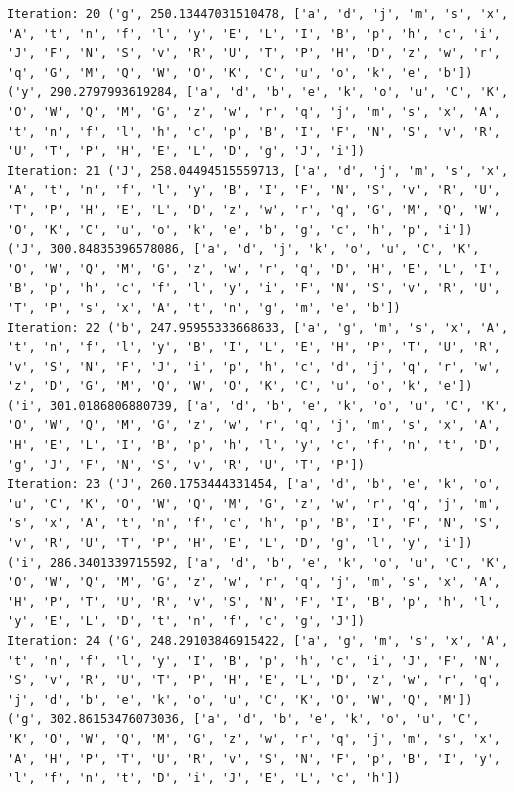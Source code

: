 \documentclass[11pt]{article}
\begin{document}
\begin{lstlisting}
Iteration: 20 ('g', 250.13447031510478, ['a', 'd', 'j', 'm', 's', 'x', 'A', 't', 'n', 'f', 'l', 'y', 'E', 'L', 'I', 'B', 'p', 'h', 'c', 'i', 'J', 'F', 'N', 'S', 'v', 'R', 'U', 'T', 'P', 'H', 'D', 'z', 'w', 'r', 'q', 'G', 'M', 'Q', 'W', 'O', 'K', 'C', 'u', 'o', 'k', 'e', 'b']) ('y', 290.2797993619284, ['a', 'd', 'b', 'e', 'k', 'o', 'u', 'C', 'K', 'O', 'W', 'Q', 'M', 'G', 'z', 'w', 'r', 'q', 'j', 'm', 's', 'x', 'A', 't', 'n', 'f', 'l', 'h', 'c', 'p', 'B', 'I', 'F', 'N', 'S', 'v', 'R', 'U', 'T', 'P', 'H', 'E', 'L', 'D', 'g', 'J', 'i'])
Iteration: 21 ('J', 258.04494515559713, ['a', 'd', 'j', 'm', 's', 'x', 'A', 't', 'n', 'f', 'l', 'y', 'B', 'I', 'F', 'N', 'S', 'v', 'R', 'U', 'T', 'P', 'H', 'E', 'L', 'D', 'z', 'w', 'r', 'q', 'G', 'M', 'Q', 'W', 'O', 'K', 'C', 'u', 'o', 'k', 'e', 'b', 'g', 'c', 'h', 'p', 'i']) ('J', 300.84835396578086, ['a', 'd', 'j', 'k', 'o', 'u', 'C', 'K', 'O', 'W', 'Q', 'M', 'G', 'z', 'w', 'r', 'q', 'D', 'H', 'E', 'L', 'I', 'B', 'p', 'h', 'c', 'f', 'l', 'y', 'i', 'F', 'N', 'S', 'v', 'R', 'U', 'T', 'P', 's', 'x', 'A', 't', 'n', 'g', 'm', 'e', 'b'])
Iteration: 22 ('b', 247.95955333668633, ['a', 'g', 'm', 's', 'x', 'A', 't', 'n', 'f', 'l', 'y', 'B', 'I', 'L', 'E', 'H', 'P', 'T', 'U', 'R', 'v', 'S', 'N', 'F', 'J', 'i', 'p', 'h', 'c', 'd', 'j', 'q', 'r', 'w', 'z', 'D', 'G', 'M', 'Q', 'W', 'O', 'K', 'C', 'u', 'o', 'k', 'e']) ('i', 301.0186806880739, ['a', 'd', 'b', 'e', 'k', 'o', 'u', 'C', 'K', 'O', 'W', 'Q', 'M', 'G', 'z', 'w', 'r', 'q', 'j', 'm', 's', 'x', 'A', 'H', 'E', 'L', 'I', 'B', 'p', 'h', 'l', 'y', 'c', 'f', 'n', 't', 'D', 'g', 'J', 'F', 'N', 'S', 'v', 'R', 'U', 'T', 'P'])
Iteration: 23 ('J', 260.1753444331454, ['a', 'd', 'b', 'e', 'k', 'o', 'u', 'C', 'K', 'O', 'W', 'Q', 'M', 'G', 'z', 'w', 'r', 'q', 'j', 'm', 's', 'x', 'A', 't', 'n', 'f', 'c', 'h', 'p', 'B', 'I', 'F', 'N', 'S', 'v', 'R', 'U', 'T', 'P', 'H', 'E', 'L', 'D', 'g', 'l', 'y', 'i']) ('i', 286.3401339715592, ['a', 'd', 'b', 'e', 'k', 'o', 'u', 'C', 'K', 'O', 'W', 'Q', 'M', 'G', 'z', 'w', 'r', 'q', 'j', 'm', 's', 'x', 'A', 'H', 'P', 'T', 'U', 'R', 'v', 'S', 'N', 'F', 'I', 'B', 'p', 'h', 'l', 'y', 'E', 'L', 'D', 't', 'n', 'f', 'c', 'g', 'J'])
Iteration: 24 ('G', 248.29103846915422, ['a', 'g', 'm', 's', 'x', 'A', 't', 'n', 'f', 'l', 'y', 'I', 'B', 'p', 'h', 'c', 'i', 'J', 'F', 'N', 'S', 'v', 'R', 'U', 'T', 'P', 'H', 'E', 'L', 'D', 'z', 'w', 'r', 'q', 'j', 'd', 'b', 'e', 'k', 'o', 'u', 'C', 'K', 'O', 'W', 'Q', 'M']) ('g', 302.86153476073036, ['a', 'd', 'b', 'e', 'k', 'o', 'u', 'C', 'K', 'O', 'W', 'Q', 'M', 'G', 'z', 'w', 'r', 'q', 'j', 'm', 's', 'x', 'A', 'H', 'P', 'T', 'U', 'R', 'v', 'S', 'N', 'F', 'p', 'B', 'I', 'y', 'l', 'f', 'n', 't', 'D', 'i', 'J', 'E', 'L', 'c', 'h'])

\end{lstlisting}
\end{document}
